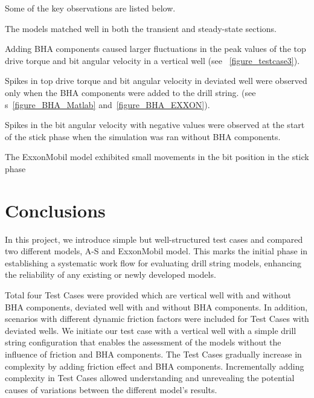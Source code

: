 Some of the key observations are listed below.
\begin{bulletedlist}
    \item The models matched well in both the transient and steady-state sections.
    \item Adding BHA components caused larger fluctuations in the peak values of the top drive torque and bit angular velocity in a vertical well (see \figurename~\ref{figure_testcase3}).
    \item Spikes in top drive torque and bit angular velocity in deviated well were observed only when the BHA components were added to the drill string. (see \figurename{}s~\ref{figure_BHA_Matlab} and~\ref{figure_BHA_EXXON}). \resolvedcomment{}
    \item Spikes in the bit angular velocity with negative values were observed at the start of the stick phase when the simulation was ran without BHA components. \resolvedcomment{}
    \item The ExxonMobil model exhibited small movements in the bit position in the stick phase
    \item
\end{bulletedlist}

\section{Conclusions}
In this project, we introduce simple but well-structured test cases and compared two different models, A-S and ExxonMobil model. This marks the initial phase in establishing a systematic work flow for evaluating drill string models, enhancing the reliability of any existing or newly developed models.

Total four Test Cases were provided which are vertical well with and without BHA components, deviated well with and without BHA components. In addition, scenarios with different dynamic friction factors were included for Test Cases with deviated wells. We initiate our test case with a vertical well with a simple drill string configuration that enables the assessment of the models without the influence of friction and BHA components. The Test Cases gradually increase in complexity by adding friction effect and BHA components. Incrementally adding complexity in Test Cases allowed understanding and unrevealing the potential causes of variations between the different model's results.

